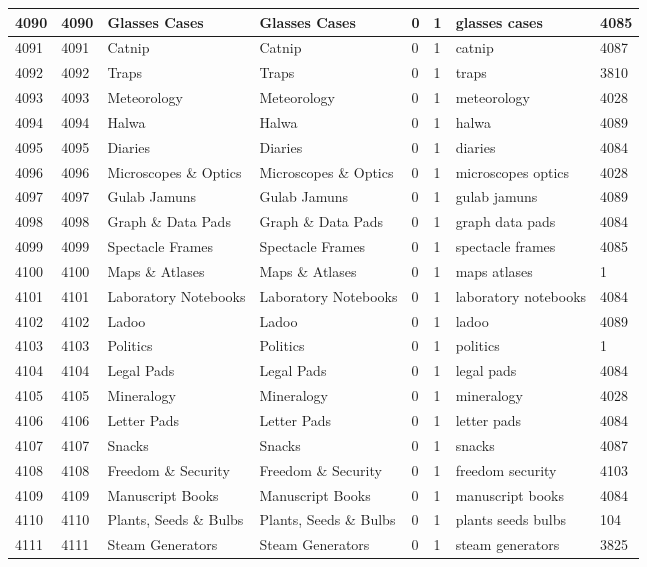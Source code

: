 \begin{longtable}{|l|l|l|l|l|l|l|l|}
4090 & 4090 & Glasses Cases & Glasses Cases & 0 & 1 & glasses cases & 4085 \\ \hline 
4091 & 4091 & Catnip & Catnip & 0 & 1 & catnip & 4087 \\ \hline 
4092 & 4092 & Traps & Traps & 0 & 1 & traps & 3810 \\ \hline 
4093 & 4093 & Meteorology & Meteorology & 0 & 1 & meteorology & 4028 \\ \hline 
4094 & 4094 & Halwa & Halwa & 0 & 1 & halwa & 4089 \\ \hline 
4095 & 4095 & Diaries & Diaries & 0 & 1 & diaries & 4084 \\ \hline 
4096 & 4096 & Microscopes \& Optics & Microscopes \& Optics & 0 & 1 & microscopes optics & 4028 \\ \hline 
4097 & 4097 & Gulab Jamuns & Gulab Jamuns & 0 & 1 & gulab jamuns & 4089 \\ \hline 
4098 & 4098 & Graph \& Data Pads & Graph \& Data Pads & 0 & 1 & graph data pads & 4084 \\ \hline 
4099 & 4099 & Spectacle Frames & Spectacle Frames & 0 & 1 & spectacle frames & 4085 \\ \hline 
4100 & 4100 & Maps \& Atlases & Maps \& Atlases & 0 & 1 & maps atlases & 1 \\ \hline 
4101 & 4101 & Laboratory Notebooks & Laboratory Notebooks & 0 & 1 & laboratory notebooks & 4084 \\ \hline 
4102 & 4102 & Ladoo & Ladoo & 0 & 1 & ladoo & 4089 \\ \hline 
4103 & 4103 & Politics & Politics & 0 & 1 & politics & 1 \\ \hline 
4104 & 4104 & Legal Pads & Legal Pads & 0 & 1 & legal pads & 4084 \\ \hline 
4105 & 4105 & Mineralogy & Mineralogy & 0 & 1 & mineralogy & 4028 \\ \hline 
4106 & 4106 & Letter Pads & Letter Pads & 0 & 1 & letter pads & 4084 \\ \hline 
4107 & 4107 & Snacks & Snacks & 0 & 1 & snacks & 4087 \\ \hline 
4108 & 4108 & Freedom \& Security & Freedom \& Security & 0 & 1 & freedom security & 4103 \\ \hline 
4109 & 4109 & Manuscript Books & Manuscript Books & 0 & 1 & manuscript books & 4084 \\ \hline 
4110 & 4110 & Plants, Seeds \& Bulbs & Plants, Seeds \& Bulbs & 0 & 1 & plants seeds bulbs & 104 \\ \hline 
4111 & 4111 & Steam Generators & Steam Generators & 0 & 1 & steam generators & 3825 \\ \hline 

\end{longtable}
